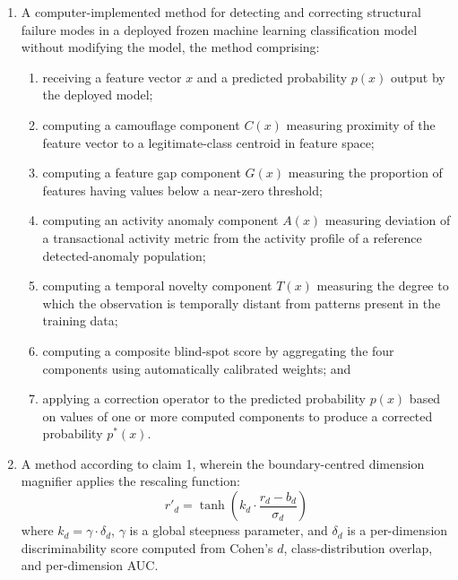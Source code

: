 \documentclass[12pt,a4paper]{article}
\begin{document}
\begin{enumerate}[label=\textbf{\arabic*.}]
\begin{enumerate}[label=(\alph*)]
\item a correction module configured to apply one or more correction
operators to the predicted probabilities of the deployed model based on
the computed component values, to produce corrected probabilities;
\end{enumerate}
wherein the failure-mode decomposition module and correction module operate
on a frozen deployed model without requiring modification or retraining of
that model.

\item A computer-implemented method for detecting and correcting structural
failure modes in a deployed frozen machine learning classification model
without modifying the model, the method comprising:
\begin{enumerate}[label=(\alph*)]
\item receiving a feature vector $x$ and a predicted probability $p(x)$
output by the deployed model;

\item computing a camouflage component $C(x)$ measuring proximity of the
feature vector to a legitimate-class centroid in feature space;

\item computing a feature gap component $G(x)$ measuring the proportion of
features having values below a near-zero threshold;

\item computing an activity anomaly component $A(x)$ measuring deviation
of a transactional activity metric from the activity profile of a reference
detected-anomaly population;

\item computing a temporal novelty component $T(x)$ measuring the degree
to which the observation is temporally distant from patterns present in
the training data;

\item computing a composite blind-spot score by aggregating the four
components using automatically calibrated weights; and

\item applying a correction operator to the predicted probability $p(x)$
based on values of one or more computed components to produce a corrected
probability $p^*(x)$.
\end{enumerate}

\item A method according to claim 1, wherein the boundary-centred dimension
magnifier applies the rescaling function:
\[
r'_d = \tanh\!\left(k_d\cdot\frac{r_d - b_d}{\sigma_d}\right)
\]
where $k_d=\gamma\cdot\delta_d$, $\gamma$ is a global steepness parameter,
and $\delta_d$ is a per-dimension discriminability score computed from
Cohen's $d$, class-distribution overlap, and per-dimension AUC.


\end{enumerate}
\end{document}
